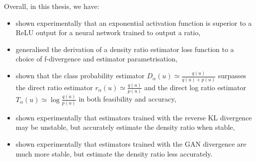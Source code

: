 \documentclass[honours,12pt]{unswthesis}
\numberwithin{equation}{section}
\theoremstyle{definition}
\begin{document}
Overall, in this thesis, we have:
\begin{itemize}
\item shown experimentally that an exponential activation function is superior to a ReLU output for a neural network trained to output a ratio,
\item generalised the derivation of a density ratio estimator loss function to a choice of f-divergence and estimator parametrisation,
\item shown that the class probability estimator $D_\alpha(u)\simeq \frac{q(u)}{q(u)+p(u)}$ surpasses the direct ratio estimator $r_\alpha(u)\simeq \frac{q(u)}{p(u)}$ and the direct log ratio estimator $T_\alpha(u)\simeq \log \frac{q(u)}{p(u)}$ in both feasibility and accuracy,
\item shown experimentally that estimators trained with the reverse KL divergence may be unstable, but accurately estimate the density ratio when stable,
\item shown experimentally that estimators trained with the GAN divergence are much more stable, but estimate the density ratio less accurately.
\end{itemize}
\end{document}

